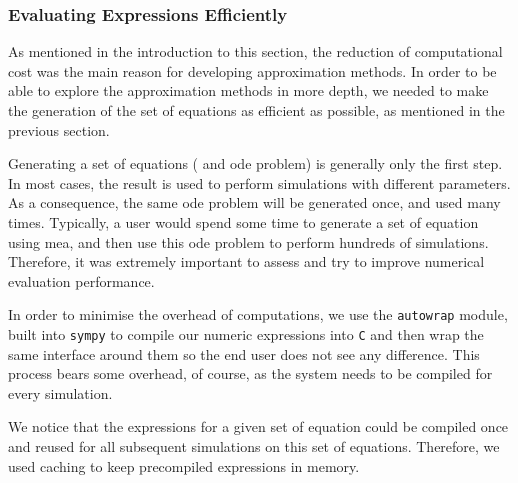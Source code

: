 \subsubsection{Evaluating Expressions Efficiently}
\label{sec:evaluating_expressions_efficiently}

As mentioned in the introduction to this section, the reduction of computational cost was the main reason for developing approximation methods.
In order to be able to explore the approximation methods in more depth,
we needed to make the generation of the set of equations as efficient as possible, as mentioned in the previous section.

Generating a set of equations (\ie{} and \gls{ode} problem) is generally only the first step.
In most cases, the result is used to perform simulations with different parameters.
As a consequence, the same \gls{ode} problem will be generated once, and used many times.
Typically, a user would spend some time to generate a set of equation using \gls{mea}, and then use this \gls{ode} problem to perform hundreds of simulations.
Therefore, it was extremely important to assess and try to improve numerical evaluation performance.
 


In order to minimise the overhead of computations, we use the {\tt autowrap} module, built into {\tt sympy} to compile our numeric expressions into \texttt{C}
and then wrap the same \py{} interface around them so the end user does not see any difference.
This process bears some overhead, of course, as the system needs to be compiled for every simulation.

We notice that the expressions for a given set of equation could be compiled once and reused for all subsequent simulations on this set of equations.
Therefore, we used caching to keep precompiled expressions in memory.
 
